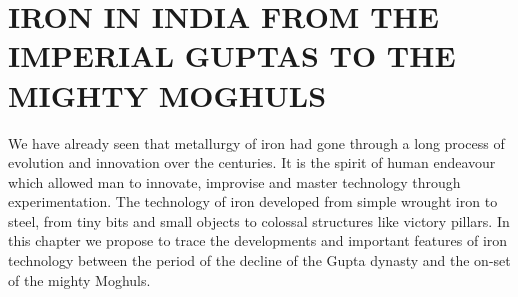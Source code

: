 \chapter{IRON IN INDIA FROM THE IMPERIAL GUPTAS TO THE MIGHTY MOGHULS}\label{chapter5}

We have already seen that metallurgy of iron had gone through a long process of evolution and innovation over the centuries. It is the spirit of human endeavour which allowed man to innovate, improvise and master technology through experimentation. The technology of iron developed from simple wrought iron to steel, from tiny bits and small objects to colossal structures like victory pillars. In this chapter we propose to trace the developments and important features of iron technology between the period of the decline of the Gupta dynasty and the on-set of the mighty Moghuls. 

